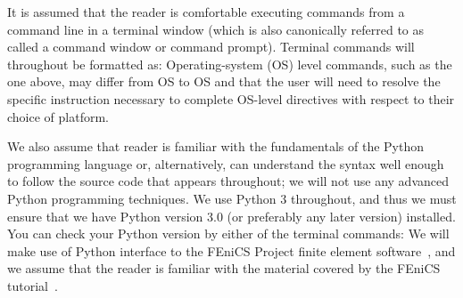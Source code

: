 It is assumed that the reader is comfortable executing commands from a
command line in a terminal window (which is also canonically referred
to as called a command window or command prompt). Terminal commands
will throughout be formatted as:
\noindent Operating-system (OS) level commands, such as the one above, may
differ from OS to OS and that the user will need to resolve the
specific instruction necessary to complete OS-level directives with
respect to their choice of platform.

We also assume that reader is familiar with the fundamentals of the
Python programming language or, alternatively, can understand the
syntax well enough to follow the source code that appears throughout;
we will not use any advanced Python programming techniques. We use
Python 3 throughout, and thus we must ensure that we have Python
version 3.0 (or preferably any later version) installed. You can check
your Python version by either of the terminal commands:
We will make use of Python interface to the FEniCS Project finite
element software~\cite{alnaes2015fenics}, and we assume that the
reader is familiar with the material covered by the FEniCS
tutorial~\cite{langtangen2016solving}.


